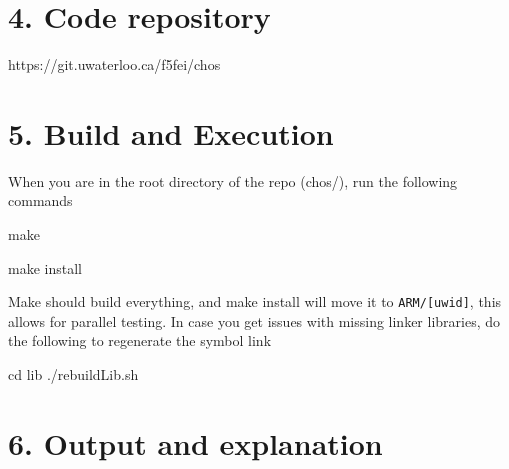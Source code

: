 \documentclass{article}
\begin{document}
\section*{4. Code repository}

https://git.uwaterloo.ca/f5fei/chos

\section*{5. Build and Execution}

When you are in the root directory of the repo (chos/), run the following commands

make

make install

Make should build everything, and make install will move it to \texttt{ARM/[uwid]}, this allows for parallel testing.
In case you get issues with missing linker libraries, do the following to regenerate the symbol link

cd lib
./rebuildLib.sh

\section*{6. Output and explanation}
\end{document}
